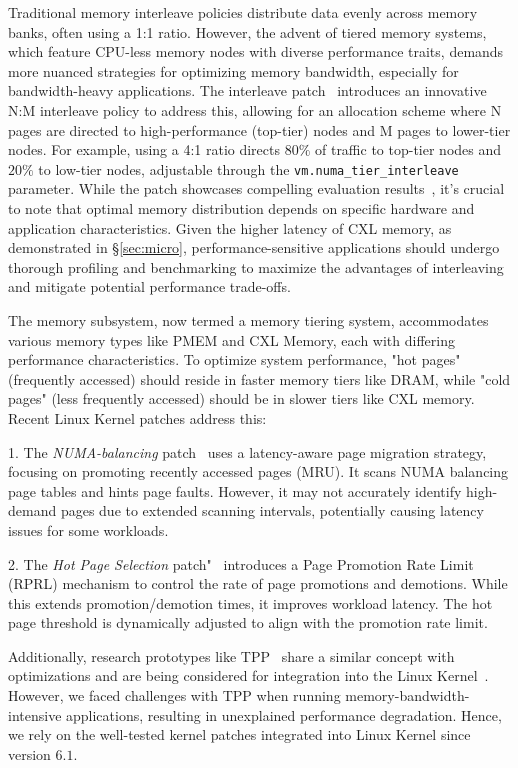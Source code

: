 Traditional memory interleave policies distribute data evenly across memory banks, often using a 1:1 ratio. However, the advent of tiered memory systems, which feature CPU-less memory nodes with diverse performance traits, demands more nuanced strategies for optimizing memory bandwidth, especially for bandwidth-heavy applications. The interleave patch~\cite{Interleavepatch} introduces an innovative N:M interleave policy to address this, allowing for an allocation scheme where N pages are directed to high-performance (top-tier) nodes and M pages to lower-tier nodes. For example, using a 4:1 ratio directs $80\%$ of traffic to top-tier nodes and $20\%$ to low-tier nodes, adjustable through the \texttt{vm.numa\_tier\_interleave} parameter. While the patch showcases compelling evaluation results~\cite{Interleavepatch}, it's crucial to note that optimal memory distribution depends on specific hardware and application characteristics. Given the higher latency of CXL memory, as demonstrated in \S\ref{sec:micro}, performance-sensitive applications should undergo thorough profiling and benchmarking to maximize the advantages of interleaving and mitigate potential performance trade-offs.



The memory subsystem, now termed a memory tiering system, accommodates various memory types like PMEM and CXL Memory, each with differing performance characteristics. To optimize system performance, "hot pages" (frequently accessed) should reside in faster memory tiers like DRAM, while "cold pages" (less frequently accessed) should be in slower tiers like CXL memory. Recent Linux Kernel patches address this:

1. The \textit{NUMA-balancing} patch~\cite{numaautobalancing} uses a latency-aware page migration strategy, focusing on promoting recently accessed pages (MRU). It scans NUMA balancing page tables and hints page faults. However, it may not accurately identify high-demand pages due to extended scanning intervals, potentially causing latency issues for some workloads.

2. The \textit{Hot Page Selection} patch"~\cite{hot} introduces a Page Promotion Rate Limit (RPRL) mechanism to control the rate of page promotions and demotions. While this extends promotion/demotion times, it improves workload latency. The hot page threshold is dynamically adjusted to align with the promotion rate limit.

Additionally, research prototypes like TPP~\cite{tpp} share a similar concept with optimizations and are being considered for integration into the Linux Kernel~\cite{tpppatch}. However, we faced challenges with TPP when running memory-bandwidth-intensive applications, resulting in unexplained performance degradation. Hence, we rely on the well-tested kernel patches integrated into Linux Kernel since version $6.1$.







